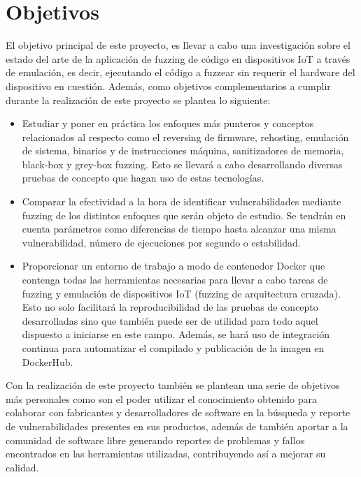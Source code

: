 \section{Objetivos}
El objetivo principal de este proyecto, es llevar a cabo una investigación sobre el estado del arte de la aplicación de fuzzing de código en dispositivos IoT
a través de emulación, es decir, ejecutando el código a fuzzear sin requerir el hardware del dispositivo en cuestión.
Además, como objetivos complementarios a cumplir durante la realización de este proyecto se plantea lo siguiente:
\begin{itemize}
    \item Estudiar y poner en práctica los enfoques más punteros y 
    conceptos relacionados al respecto como el reversing de firmware, rehosting, emulación de sistema, binarios y de instrucciones máquina, 
    sanitizadores de memoria, black-box y grey-box fuzzing. Esto se llevará a cabo desarrollando diversas pruebas de concepto que hagan uso
    de estas tecnologías.
    \item Comparar la efectividad a la hora de identificar vulnerabilidades mediante fuzzing de los distintos enfoques que serán objeto de estudio. 
    Se tendrán en cuenta parámetros como diferencias de tiempo hasta alcanzar una misma vulnerabilidad, número de ejecuciones por segundo o estabilidad.
    \item Proporcionar un entorno de trabajo a modo de contenedor Docker que contenga todas las herramientas necesarias para llevar a cabo tareas de 
    fuzzing y emulación de dispositivos IoT (fuzzing de arquitectura cruzada). Esto no solo facilitará la reproducibilidad de las pruebas de 
    concepto desarrolladas sino que también puede ser de utilidad para todo aquel dispuesto a iniciarse en este campo. Además, se hará uso de 
    integración continua para automatizar el compilado y publicación de la imagen en DockerHub.
\end{itemize}

Con la realización de este proyecto también se plantean una serie de objetivos más personales como son el poder utilizar el conocimiento obtenido 
para colaborar con fabricantes y desarrolladores de software en la búsqueda y reporte de vulnerabilidades presentes en sus productos, además de también
aportar a la comunidad de software libre generando reportes de problemas y fallos encontrados en las herramientas utilizadas, contribuyendo así
a mejorar su calidad. 

